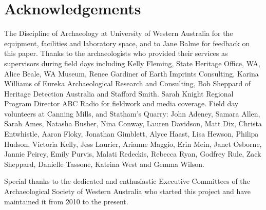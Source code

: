 \documentclass{ijsra}
\begin{document}
\section{Acknowledgements}

The Discipline of Archaeology at University of Western Australia for the equipment, facilities and laboratory space, and to Jane Balme for feedback on this paper. Thanks to the archaeologists who provided their services as supervisors during field days including Kelly Fleming, State Heritage Office, WA, Alice Beale, WA Museum, Renee Gardiner of Earth Imprints Consulting, Karina Williams of Eureka Archaeological Research and Consulting, Bob Sheppard of Heritage Detection Australia and Stafford Smith. Sarah Knight Regional Program Director ABC Radio for fieldwork and media coverage. Field day volunteers at Canning Mills, and Statham’s Quarry: John Adeney, Samara Allen, Sarah Ames, Natasha Busher, Nina Conway, Lauren Davidson, Matt Dix, Christa Entwhistle, Aaron Floky, Jonathan Gimblett, Alyce Haast, Lisa Hewson, Philipa Hudson, Victoria Kelly, Jess Laurier, Arianne Maggio, Erin Mein, Janet Osborne, Jannie Peircy, Emily Purvis, Malati Redeckis, Rebecca Ryan, Godfrey Rule, Zack Sheppard, Danielle Tassone, Katrina West and Gemma Wilson.

Special thanks to the dedicated and enthusiastic Executive Committees of the Archaeological Society of Western Australia who started this project and have maintained it from 2010 to the present.


\IJSRAclosing
\end{document}
